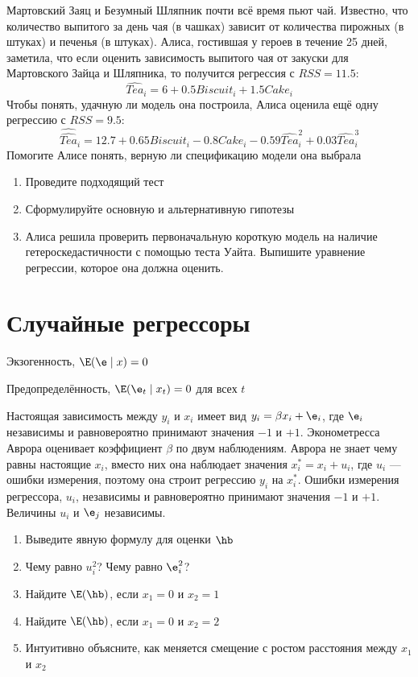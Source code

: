 \documentclass[pdftex,11pt,openany]{book}\usepackage[]{graphicx}\usepackage[]{color}
\begin{document}
\begin{problem}
Мартовский Заяц и Безумный Шляпник почти всё время пьют чай. Известно, что количество выпитого за день чая (в чашках) зависит от количества пирожных (в штуках) и печенья (в штуках).
Алиса, гостившая у героев в течение 25 дней, заметила, что если оценить зависимость выпитого чая от закуски для Мартовского Зайца и Шляпника, то получится регрессия с $RSS=11.5$:
\[
\widehat{Tea}_i=6+0.5Biscuit_i+1.5Cake_i
\] 
Чтобы понять, удачную ли модель она построила,  Алиса оценила ещё одну регрессию с $RSS=9.5$: 
\[
\widehat{\widehat{Tea}}_i=12.7+0.65Biscuit_i-0.8Cake_i-0.59\widehat{Tea}^2_i+0.03\widehat{Tea}^3_i
\]
Помогите Алисе понять, верную ли спецификацию модели она выбрала
\begin{enumerate}
\item Проведите подходящий тест 
\item Сформулируйте основную и альтернативную гипотезы
\item Алиса решила проверить первоначальную короткую модель на наличие гетероскедастичности с помощью теста Уайта. Выпишите уравнение регрессии, которое она должна оценить.
\end{enumerate}
\end{problem}

\begin{solution}
\end{solution}



%


\chapter{Случайные регрессоры}

\begin{problemtext}

Экзогенность, $\E(\e\mid x)=0$

Предопределённость, $\E(\e_t\mid x_t)=0$ для всех $t$
\end{problemtext}


\begin{problem}
Настоящая зависимость между $y_i$ и $x_i$ имеет вид $y_i=\beta x_i +\e_i$, где $\e_i$ независимы и равновероятно принимают значения $-1$ и $+1$. Эконометресса Аврора оценивает коэффициент $\beta$ по двум наблюдениям. Аврора не знает чему равны настоящие $x_i$, вместо них она наблюдает значения $x^*_i=x_i+u_i$, где $u_i$ --- ошибки измерения, поэтому она строит регрессию $y_i$ на $x_i^*$. Ошибки измерения регрессора, $u_i$, независимы и равновероятно принимают значения $-1$ и $+1$. Величины $u_i$ и $\e_j$ независимы.
\begin{enumerate}
\item Выведите явную формулу для оценки $\hb$
\item Чему равно $u_i^2$? Чему равно $\e_i^2$?
\item Найдите $\E(\hb)$, если $x_1=0$ и $x_2=1$
\item Найдите $\E(\hb)$, если $x_1=0$ и $x_2=2$
\item Интуитивно объясните, как меняется смещение с ростом расстояния между $x_1$ и $x_2$
\end{enumerate}
\end{problem}
\end{document}
